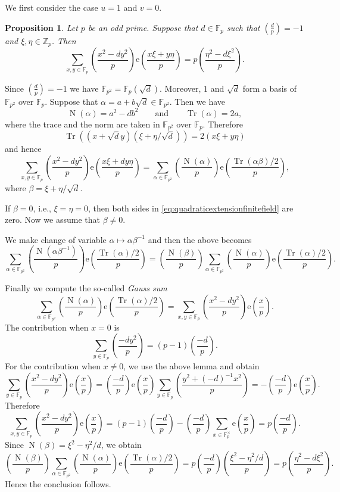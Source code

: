 \documentclass[10pt,oneside,reqno]{amsart}
\makeatletter
\newcommand\rme{\mathrm{e}}
\newcommand\FF{\mathbb{F}}
\newcommand\ZZ{\mathbb{Z}}
\DeclareMathOperator\Tr{Tr}
\DeclareMathOperator\norm{N}
\newcommand\legendresymbol[2]{\genfrac{(}{)}{}{}{#1}{#2}}
\theoremstyle{THEOREM}
\newtheorem{proposition}[theorem]{Proposition}
\theoremstyle{DEFINITION}
\theoremstyle{EXERCISE}
\numberwithin{equation}{section}
\renewenvironment{proof}[1][\proofname]{\par
  \vspace{-6pt}
  \pushQED{\qed}
  \normalfont \topsep6\p@\@plus6\p@\relax
  \trivlist
  \item[\hskip\labelsep\rmfamily\bfseries
    #1\@addpunct{:}]\ignorespaces
}{
  \popQED\endtrivlist\@endpefalse
  \vspace{-6pt}
}
\makeatother
\begin{document}
We first consider the case $u=1$ and $v=0$.
\begin{proposition}\label{prop:fouriertransformfinitefield}
Let $p$ be an odd prime. Suppose that $d\in \FF_p$ such that $\legendresymbol{d}{p}=-1$ and $\xi,\eta\in \ZZ_p$. Then
\begin{equation}\label{eq:quadraticextensionfinitefield}
\sum_{x,y\in \FF_p}\legendresymbol{x^2-dy^2}{p}\rme\legendresymbol{x\xi+y\eta}{p} =p\legendresymbol{\eta^2-d\xi^2}{p}.
\end{equation}
\end{proposition}
\begin{proof}
Since $\legendresymbol{d}{p}=-1$ we have $\FF_{p^2}=\FF_p(\sqrt d)$. Moreover, $1$ and $\sqrt{d}$ form a basis of $\FF_{p^2}$ over $\FF_p$. Suppose that $\alpha=a+b\sqrt{d}\in\FF_{p^2}$. Then we have
\[
\norm(\alpha)=a^2-db^2\qquad\text{and}\qquad \Tr(\alpha)=2a,
\]
where the trace and the norm are taken in  $\FF_{p^2}$ over $\FF_p$. Therefore
\[
\Tr((x+\sqrt{d}y)(\xi+\eta/\sqrt{d}))=2(x\xi+y\eta)
\]
and hence
\[
\sum_{x,y\in \FF_p}\legendresymbol{x^2-dy^2}{p}\rme\legendresymbol{x\xi+dy\eta}{p} =\sum_{\alpha\in \FF_{p^2}}\legendresymbol{\norm(\alpha)}{p}\rme\legendresymbol{\Tr(\alpha\beta)/2}{p},
\]
where $\beta=\xi+\eta/\sqrt{d}$. 

If $\beta=0$, i.e., $\xi=\eta=0$, then both sides in \eqref{eq:quadraticextensionfinitefield} are zero. Now we assume that $\beta\neq 0$.

We make change of variable $\alpha\mapsto\alpha\beta^{-1}$ and then the above becomes
\[
\sum_{\alpha\in \FF_{p^2}}\legendresymbol{\norm(\alpha\beta^{-1})}{p}\rme\legendresymbol{\Tr(\alpha)/2}{p}= \legendresymbol{\norm(\beta)}{p}\sum_{\alpha\in \FF_{p^2}}\legendresymbol{\norm(\alpha)}{p}\rme\legendresymbol{\Tr(\alpha)/2}{p}.
\]

Finally we compute the so-called \emph{Gauss sum}
\[
\sum_{\alpha\in \FF_{p^2}}\legendresymbol{\norm(\alpha)}{p}\rme\legendresymbol{\Tr(\alpha)/2}{p} =\sum_{x,y\in \FF_p}\legendresymbol{x^2-dy^2}{p}\rme\legendresymbol{x}{p}.
\]
The contribution when $x=0$ is
\[
\sum_{y\in \FF_p}\legendresymbol{-dy^2}{p}=(p-1)\legendresymbol{-d}{p}.
\]
For the contribution when $x\neq 0$, we use the above lemma and obtain
\[
\sum_{y\in \FF_p}\legendresymbol{x^2-dy^2}{p}\rme\legendresymbol{x}{p}=\legendresymbol{-d}{p} \rme\legendresymbol{x}{p}\sum_{y\in \FF_p}\legendresymbol{y^2+(-d)^{-1}x^2}{p}=-\legendresymbol{-d}{p} \rme\legendresymbol{x}{p}.
\]
Therefore
\[
\sum_{x,y\in \FF_p}\legendresymbol{x^2-dy^2}{p}\rme\legendresymbol{x}{p}=(p-1)\legendresymbol{-d}{p} -\legendresymbol{-d}{p} \sum_{x\in \FF_p^\times}\rme\legendresymbol{x}{p}=p\legendresymbol{-d}{p}.
\]
Since $\norm(\beta)=\xi^2-\eta^2/d$, we obtain 
\[
\legendresymbol{\norm(\beta)}{p}\sum_{\alpha\in \FF_{p^2}}\legendresymbol{\norm(\alpha)}{p}\rme\legendresymbol{\Tr(\alpha)/2}{p}= p\legendresymbol{-d}{p}\legendresymbol{\xi^2-\eta^2/d}{p}=p\legendresymbol{\eta^2-d\xi^2}{p}.
\]
Hence the conclusion follows.
\end{proof}
\end{document}
